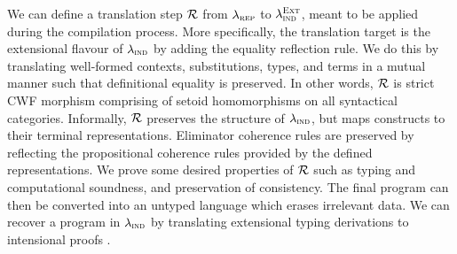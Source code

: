 We can define a translation step $\mathcal{R}$ from $\lambda_{\textsc{rep}}$ to
$\lambda_{\textsc{ind}}^{\textsc{Ext}}$, meant to be applied during the compilation process.
More specifically, the translation target is the extensional flavour of
$\lambda_{\textsc{ind}}$ by adding the equality reflection rule. We do this by translating
well-formed contexts, substitutions, types, and terms in a mutual manner such
that definitional equality is preserved. In other words, $\mathcal{R}$ is strict CWF
\cite{Castellan2019-sh} morphism comprising of setoid homomorphisms on all
syntactical categories. Informally, $\mathcal{R}$ preserves the structure of
$\lambda_{\textsc{ind}}$, but maps constructs to their terminal representations. Eliminator
coherence rules are preserved by reflecting the propositional coherence rules
provided by the defined representations. We prove some desired properties of
$\mathcal{R}$ \cite{Boulier2017-cm} such as typing and computational soundness, and
preservation of consistency. The final program can then be converted into an
untyped language which erases irrelevant data. We can recover a program
in $\lambda_{\textsc{ind}}$ by translating extensional typing derivations to intensional
proofs \cite{Winterhalter2019-zw}.
